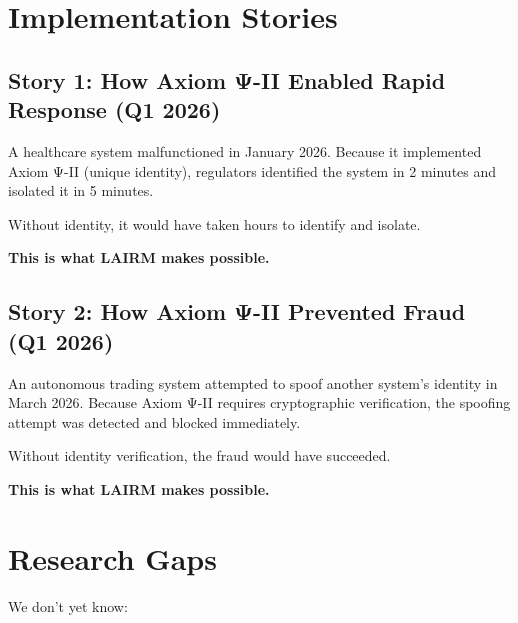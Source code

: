 \vspace{0.5cm}

\section{Implementation Stories}

\subsection{Story 1: How Axiom Ψ-II Enabled Rapid Response (Q1 2026)}

A healthcare system malfunctioned in January 2026. Because it implemented Axiom Ψ-II (unique identity), regulators identified the system in 2 minutes and isolated it in 5 minutes.

Without identity, it would have taken hours to identify and isolate.

\textbf{This is what LAIRM makes possible.}

\subsection{Story 2: How Axiom Ψ-II Prevented Fraud (Q1 2026)}

An autonomous trading system attempted to spoof another system's identity in March 2026. Because Axiom Ψ-II requires cryptographic verification, the spoofing attempt was detected and blocked immediately.

Without identity verification, the fraud would have succeeded.

\textbf{This is what LAIRM makes possible.}

\vspace{0.5cm}

\section{Research Gaps}

We don't yet know:

